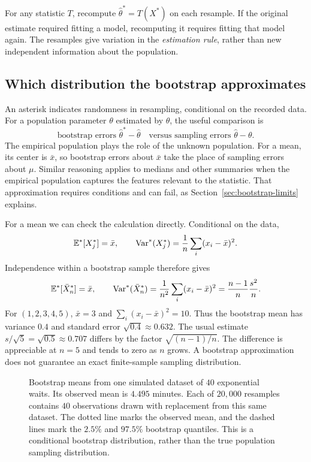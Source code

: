 For any statistic \(T\), recompute \(\widehat\theta^*=T(X^*)\)
on each resample. If the original estimate required fitting a model,
recomputing it requires fitting that model again. The resamples give
variation in the \emph{estimation rule}, rather than new independent
information about the population.

\subsection{Which distribution the bootstrap approximates}

An asterisk indicates randomness in resampling, conditional on the
recorded data. For a population parameter \(\theta\) estimated by
\(\widehat\theta\), the useful comparison is
\[
  \text{bootstrap errors }\widehat\theta^*-\widehat\theta
  \quad\text{versus sampling errors }\widehat\theta-\theta.
\]
The empirical population plays the role of the unknown population.
For a mean, its center is \(\bar x\), so bootstrap errors about
\(\bar x\) take the place of sampling errors about \(\mu\).
Similar reasoning applies to medians and other summaries when the
empirical population captures the features relevant to the statistic.
That approximation requires conditions and can fail, as
Section~\ref{sec:bootstrap-limits} explains.

For a mean we can check the calculation directly. Conditional on the data,
\[
  \mathbb{E}^*[X_j^*]=\bar x,\qquad
  \operatorname{Var}^*(X_j^*)=\frac1n\sum_i(x_i-\bar x)^2.
\]
Independence within a bootstrap sample therefore gives
\begin{equation}
  \mathbb{E}^*[\bar X_n^*]=\bar x,\qquad
  \operatorname{Var}^*(\bar X_n^*)=\frac1{n^2}\sum_i(x_i-\bar x)^2
  =\frac{n-1}{n}\frac{s^2}{n}.
  \label{eq:bootstrap-mean-variance}
\end{equation}
For \((1,2,3,4,5)\), \(\bar x=3\) and
\(\sum_i(x_i-\bar x)^2=10\). Thus the bootstrap mean has variance
\(0.4\) and standard error \(\sqrt{0.4}\approx0.632\).
The usual estimate \(s/\sqrt5=\sqrt{0.5}\approx0.707\) differs
by the factor \(\sqrt{(n-1)/n}\). The difference is appreciable at
\(n=5\) and tends to zero as \(n\) grows. A bootstrap approximation
does not guarantee an exact finite-sample sampling distribution.

\begin{figure}[H]
  \centering\InfBootstrapPlot
  \caption{Bootstrap means from one simulated dataset of \(40\)
  exponential waits. Its observed mean is \(4.495\) minutes. Each of
  \(20{,}000\) resamples contains \(40\) observations drawn with
  replacement from this same dataset. The dotted line marks the
  observed mean, and the dashed lines mark the \(2.5\%\) and
  \(97.5\%\) bootstrap quantiles. This is a conditional bootstrap
  distribution, rather than the true population sampling distribution.}
  \label{fig:bootstrap-errors}
\end{figure}

